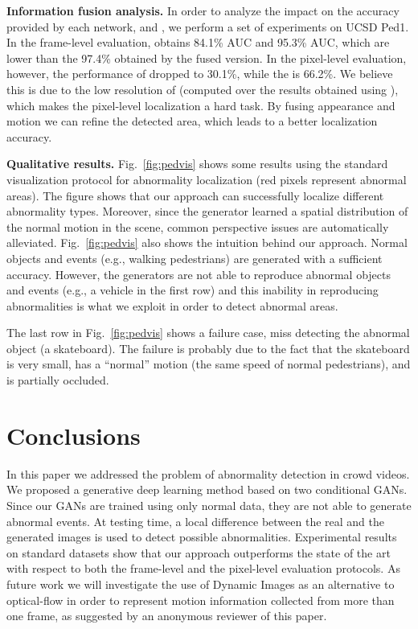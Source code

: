 \documentclass{article}
\begin{document}
	\noindent\textbf{Information fusion analysis.}
	In order to analyze the impact on the accuracy provided by each network,  and , we perform a set of experiments on UCSD Ped1. In the frame-level evaluation,  obtains 84.1\% AUC and  95.3\% AUC, which are lower than the 97.4\% obtained by the fused version. In the pixel-level evaluation, however, the performance of  dropped to 30.1\%, while the  is 66.2\%. 
We believe this is due to the low resolution of  (computed over the results obtained using
), which makes the pixel-level localization a hard task.
By fusing appearance and motion we can refine the detected area, which leads to a better localization accuracy. 
	
	\noindent\textbf{Qualitative results.} 
Fig.~\ref{fig:pedvis} shows some results using the standard visualization protocol for abnormality localization (red pixels represent abnormal areas). The figure shows that our approach can successfully localize different abnormality types. Moreover, since the generator learned a spatial distribution of the normal motion in the scene, common perspective issues are automatically alleviated. Fig.~\ref{fig:pedvis} also shows the intuition behind our approach. Normal objects and events (e.g., walking pedestrians) are generated with a sufficient accuracy. However, the generators are not able to reproduce abnormal objects and events (e.g., a vehicle in the first row) and this inability in reproducing abnormalities is what we exploit in order to detect abnormal areas. 

The last row in Fig.~\ref{fig:pedvis} shows a failure case, miss detecting the abnormal object (a skateboard). The failure is probably due to the fact that the skateboard is very small, has a ``normal'' motion (the same speed of normal pedestrians), and is partially occluded. 
	
	
	\section{Conclusions}
In this paper we addressed the problem of abnormality detection in crowd videos. We proposed a generative deep learning method based on two conditional GANs. 
	Since our GANs are trained using only normal data, they are not able to generate abnormal events. At testing time, a local difference between the real and the generated images is used to detect possible abnormalities.
	Experimental results on standard datasets show that our approach outperforms the state of the art with respect to both the frame-level and the pixel-level evaluation protocols. As future work we will investigate the use of Dynamic Images \cite{Bilen16a} as an alternative to optical-flow in order to represent motion information collected from more than one frame, as suggested by an anonymous reviewer of this paper.
	
	

	
	
\end{document}
